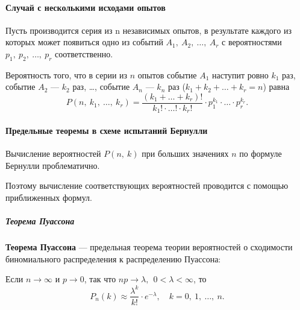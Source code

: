 \documentclass[a4paper]{article}
\newcommand{\key}[1]{{\color{Medium}\bfseries #1}}
\begin{document}
                \paragraph{Случай с несколькими исходами опытов}

                    Пусть производится серия из n независимых опытов, в результате каждого из которых может появиться одно из событий $A_1 , \: A_2 , \: \ldots , \: A_r$ с вероятностями $p_1 , \: p_2 , \: \ldots , \: p_r$ соответственно.

                    Вероятность того, что в серии из $n$ опытов событие $A_1$ наступит ровно $k_1$ раз, событие $A_2$ --- $k_2$ раз, \ldots, событие $A_n$ --- $k_n$ раз ($k_1 + k_2 + \ldots + k_r = n$) равна
                    \begin{equation*}
                        P(n, \: k_1 , \: \ldots , \: k_r) =
                            \frac{(k_1 + \ldots + k_r)!}{k_1! \cdot \ldots! \cdot k_r!} \cdot
                            p_1^{k_1} \cdot \ldots \cdot p_r^{k_r} .
                    \end{equation*}

                \paragraph{Предельные теоремы в схеме испытаний Бернулли}

                    Вычисление вероятностей $P(n, \: k)$ при больших значениях $n$ по формуле Бернулли проблематично.
                    
                    Поэтому вычисление соответствующих вероятностей проводится с помощью приближенных формул.
                    
                    \subparagraph{Теорема Пуассона}

                        \key{Теорема Пуассона} --- предельная теорема теории вероятностей о сходимости биномиального распределения к распределению Пуассона:

                        Если $n \to \infty$ и $p \to 0$, так что $n p \to \lambda, \:\: 0 < \lambda < \infty$, то
                        \begin{equation*}
                            P_n(k) \approx \frac{\lambda^k}{k!} \cdot e^{-\lambda}, \quad
                                k = 0 , \: 1 , \: \ldots , \: n .
                        \end{equation*}
\end{document}
